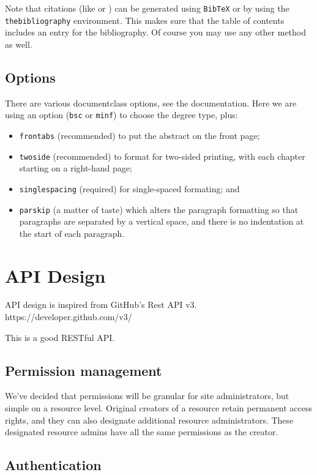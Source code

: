 \documentclass[bsc,frontabs,twoside,singlespacing,parskip,deptreport]{infthesis}     %
\begin{document}
Note that citations
(like \cite{P1} or \cite{P2})
can be generated using {\tt BibTeX} or by using the
{\tt thebibliography} environment. This makes sure that the
table of contents includes an entry for the bibliography.
Of course you may use any other method as well.

\section{Options}

There are various documentclass options, see the documentation.  Here we are
using an option ({\tt bsc} or {\tt minf}) to choose the degree type, plus:
\begin{itemize}
\item {\tt frontabs} (recommended) to put the abstract on the front page;
\item {\tt twoside} (recommended) to format for two-sided printing, with
  each chapter starting on a right-hand page;
\item {\tt singlespacing} (required) for single-spaced formating; and
\item {\tt parskip} (a matter of taste) which alters the paragraph formatting so that
paragraphs are separated by a vertical space, and there is no
indentation at the start of each paragraph.
\end{itemize}

\chapter{API Design}

API design is inspired from GitHub's Rest API v3. https://developer.github.com/v3/

This is a good RESTful API.

\section{Permission management}

We've decided that permissions will be granular for site administrators, but simple on a resource level. Original creators of a resource retain permanent access rights, and they can also designate additional resource administrators. These designated resource admins have all the same permissions as the creator.

\section{Authentication}
\end{document}
